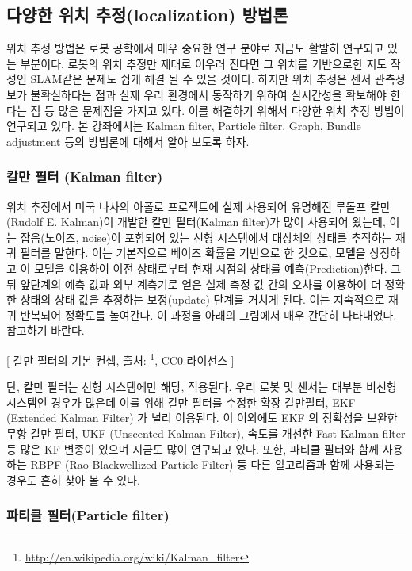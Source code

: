 \subsection{다양한 위치 추정(localization) 방법론}

위치 추정 방법은 로봇 공학에서 매우 중요한 연구 분야로 지금도 활발히 연구되고 있는 부분이다. 로봇의 위치 추정만 제대로 이우러 진다면 그 위치를 기반으로한 지도 작성인 SLAM같은 문제도 쉽게 해결 될 수 있을 것이다. 하지만 위치 추정은 센서 관측정보가 불확실하다는 점과 실제 우리 환경에서 동작하기 위하여 실시간성을 확보해야 한다는 점 등 많은 문제점을 가지고 있다. 이를 해결하기 위해서 다양한 위치 추정 방법이 연구되고 있다. 본 강좌에서는 Kalman filter, Particle filter, Graph, Bundle adjustment 등의 방법론에 대해서 알아 보도록 하자. 

\subsubsection{칼만 필터 (Kalman filter)}

위치 추정에서 미국 나사의 아폴로 프로젝트에 실제 사용되어 유명해진 루돌프 칼만(Rudolf E. Kalman)이 개발한 칼만 필터(Kalman filter)가 많이 사용되어 왔는데, 이는 잡음(노이즈, noise)이 포함되어 있는 선형 시스템에서 대상체의 상태를 추적하는 재귀 필터를 말한다. 이는 기본적으로 베이즈 확률을 기반으로 한 것으로, 모델을 상정하고 이 모델을 이용하여 이전 상태로부터 현재 시점의 상태를 예측(Prediction)한다. 그 뒤 앞단계의 예측 값과 외부 계측기로 얻은 실제 측정 값 간의 오차를 이용하여 더 정확한 상태의 상태 값을 추정하는 보정(update) 단계를 거치게 된다. 이는 지속적으로 재귀 반복되어 정확도를 높여간다. 이 과정을 아래의 그림에서 매우 간단히 나타내었다. 참고하기 바란다.


[ 칼만 필터의 기본 컨셉, 출처: \footnote{\url{http://en.wikipedia.org/wiki/Kalman_filter}}, CC0 라이선스 ]


단, 칼만 필터는 선형 시스템에만 해당, 적용된다. 우리 로봇 및 센서는 대부분 비선형 시스템인 경우가 많은데 이를 위해 칼만 필터를 수정한 확장 칼만필터, EKF (Extended Kalman Filter) 가 널리 이용된다. 이 이외에도 EKF 의 정확성을 보완한 무향 칼만 필터, UKF (Unscented Kalman Filter), 속도를 개선한 Fast Kalman filter 등 많은 KF 변종이 있으며 지금도 많이 연구되고 있다. 또한, 파티클 필터와 함께 사용하는 RBPF (Rao-Blackwellized Particle Filter) 등 다른 알고리즘과 함께 사용되는 경우도 흔히 찾아 볼 수 있다.


\subsubsection{파티클 필터(Particle filter)}

